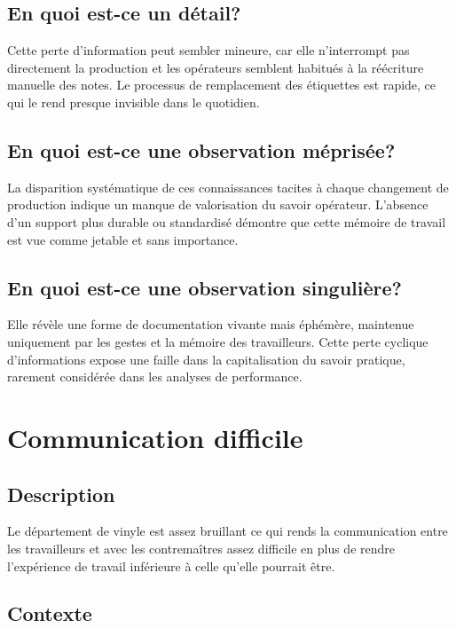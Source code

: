 \documentclass[a11paper]{article}
\begin{document}
\subsection{En quoi est-ce un détail?}

Cette perte d’information peut sembler mineure, car elle n’interrompt pas directement la
production et les opérateurs semblent habitués à la réécriture manuelle des notes. Le
processus de remplacement des étiquettes est rapide, ce qui le rend presque invisible
dans le quotidien.

\subsection{En quoi est-ce une observation méprisée?}

La disparition systématique de ces connaissances tacites à chaque changement de production
indique un manque de valorisation du savoir opérateur. L'absence d’un support plus durable
ou standardisé démontre que cette mémoire de travail est vue comme jetable et sans importance.

\subsection{En quoi est-ce une observation singulière?}

Elle révèle une forme de documentation vivante mais éphémère, maintenue uniquement par les
gestes et la mémoire des travailleurs. Cette perte cyclique d’informations expose une faille
dans la capitalisation du savoir pratique, rarement considérée dans les analyses de performance.

\newpage
\section{Communication difficile}
\subsection{Description}

Le département de vinyle est assez bruillant ce qui rends la communication
entre les travailleurs et avec les contremaîtres assez difficile en plus de
rendre l'expérience de travail inférieure à celle qu'elle pourrait être.

\subsection{Contexte}
\end{document}
